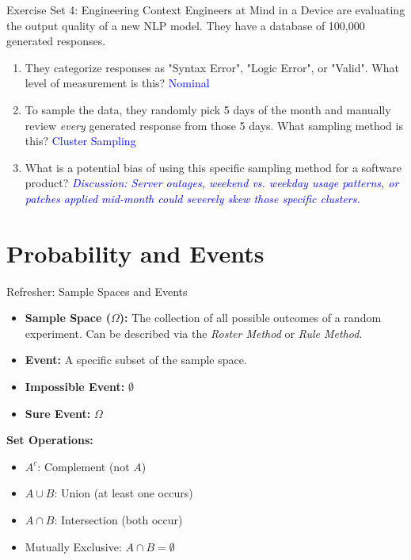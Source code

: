 \documentclass[aspectratio=169]{beamer}
\begin{document}
\begin{frame}{Exercise Set 4: Engineering Context}
    Engineers at Mind in a Device are evaluating the output quality of a new NLP model. They have a database of 100,000 generated responses.
    \vspace{0.3cm}
    \begin{enumerate}
        \item They categorize responses as "Syntax Error", "Logic Error", or "Valid". What level of measurement is this? \pause \hfill \textcolor{blue}{Nominal}
        \item To sample the data, they randomly pick 5 days of the month and manually review \emph{every} generated response from those 5 days. What sampling method is this? \pause \hfill \textcolor{blue}{Cluster Sampling}
        \item What is a potential bias of using this specific sampling method for a software product? \pause \hfill \textcolor{blue}{\textit{Discussion: Server outages, weekend vs. weekday usage patterns, or patches applied mid-month could severely skew those specific clusters.}}
    \end{enumerate}
\end{frame}

\section{Probability and Events}

\begin{frame}{Refresher: Sample Spaces and Events}
    \begin{itemize}
        \item \textbf{Sample Space ($\Omega$):} The collection of all possible outcomes of a random experiment. Can be described via the \emph{Roster Method} or \emph{Rule Method}.
        \item \textbf{Event:} A specific subset of the sample space.
        \item \textbf{Impossible Event:} $\emptyset$
        \item \textbf{Sure Event:} $\Omega$
    \end{itemize}
    \vspace{0.3cm}
    \textbf{Set Operations:}
    \begin{itemize}
        \item $A^c$: Complement (not $A$)
        \item $A \cup B$: Union (at least one occurs)
        \item $A \cap B$: Intersection (both occur)
        \item Mutually Exclusive: $A \cap B = \emptyset$
    \end{itemize}
\end{frame}
\end{document}
